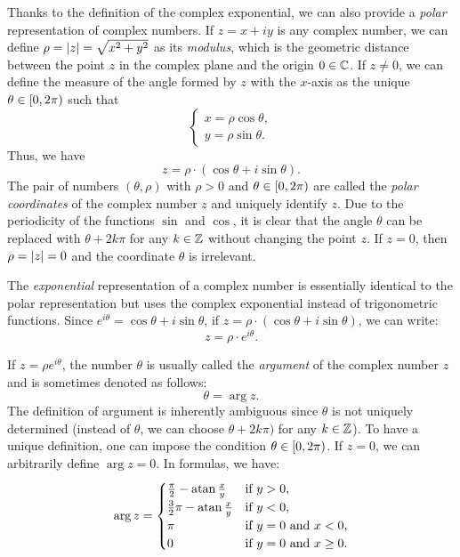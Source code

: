 Thanks to the definition of the complex exponential, we can also provide a
\emph{polar} representation of complex numbers. If $z=x+iy$ is any complex
number, we can define $\rho = {\left|z\right|} = \sqrt{x^2+y^2}$ as its \emph{modulus},
which is the geometric distance between the point $z$ in the complex plane and
the origin $0\in {\mathbb C}$. If $z\neq 0$, we can define the measure of the angle
formed by $z$ with the $x$-axis as the unique $\theta \in
\left[0,2\pi\right)$ such that
\[
  \begin{cases}
    x = \rho \cos \theta,\\
    y = \rho \sin \theta.
  \end{cases}
\]
Thus, we have 
\[
  z = \rho \cdot (\cos \theta + i \sin \theta). 
\]
The pair of numbers $(\theta,\rho)$ with $\rho>0$ and
$\theta\in\left[0,2\pi\right)$ are called the \emph{polar coordinates}
of the complex number $z$ and uniquely identify $z$. Due to the periodicity of
the functions $\sin$ and $\cos$, it is clear that the angle $\theta$ can be
replaced with $\theta +2k\pi$ for any $k\in {\mathbb Z}$ without changing the point $z$.
If $z=0$, then $\rho={\left|z\right|}=0$ and the coordinate $\theta$ is irrelevant.

The \emph{exponential} representation of a complex number is essentially
identical to the polar representation but uses the complex exponential instead
of trigonometric functions. Since $e^{i\theta} = \cos \theta + i\sin \theta$, if
$z=\rho\cdot (\cos \theta + i \sin \theta)$, we can write:
\[
  z = \rho \cdot e^{i\theta}.  
\]

If $z=\rho e^{i\theta}$, the number $\theta$ is usually called the
\emph{argument} of the complex number $z$ and is sometimes denoted as follows:
\[
  \theta = \arg z.  
\]
The definition of argument is inherently ambiguous since $\theta$ is not
uniquely determined (instead of $\theta$, we can choose $\theta+2k\pi)$ for any
$k\in {\mathbb Z}$). To have a unique definition, one can impose the condition
$\theta\in\left[0,2\pi\right)$.
If $z=0$, we can arbitrarily define $\arg z = 0$. In formulas, we have:
\[
  \arg z =
  \begin{cases}
   \frac \pi 2 - \operatorname{atan} \frac x y & \text{if $y>0$,} \\
   \frac 3 2 \pi- \operatorname{atan} \frac x y & \text{if $y<0$,} \\
   \pi & \text{if $y=0$ and $x<0$,} \\
   0 & \text{if $y=0$ and $x\ge 0$.}
   \end{cases}
\]

